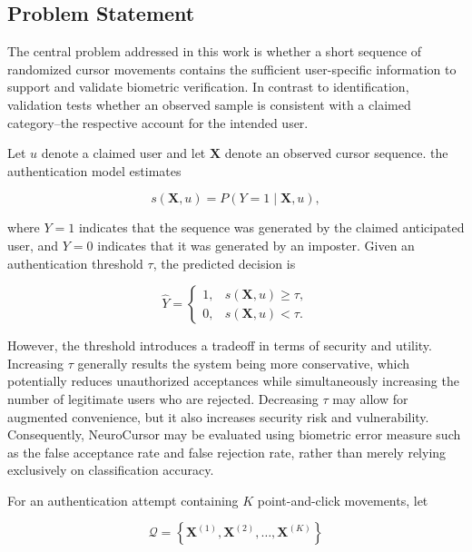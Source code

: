 \documentclass[conference]{IEEEtran}
\begin{document}
\subsection{Problem Statement}

The central problem addressed in this work is whether a short sequence of randomized cursor movements contains the sufficient user-specific information to support and validate biometric verification. In contrast to identification, validation tests whether an observed sample is consistent with a claimed category--the respective account for the intended user. 

Let $u$ denote a claimed user and let $\mathbf{X}$ denote an observed cursor sequence. the authentication model estimates 

\begin{equation}
s(\mathbf{X},u)
=
P(Y=1 \mid \mathbf{X}, u), 
\label{eq:auth_probability}
\end{equation}

where $Y=1$ indicates that the sequence was generated by the claimed anticipated user, and $Y=0$ indicates that it was generated by an imposter. Given an authentication threshold $\tau$, the predicted decision is 

\begin{equation}
\widehat{Y}
=
\begin{cases}
1, & s(\mathbf{X}, u) \geq \tau,\\
0, & s(\mathbf{X}, u) < \tau.
\end{cases}
\label{eq:threshold_decision}
\end{equation}

However, the threshold introduces a tradeoff in terms of security and utility. Increasing $\tau$ generally results the system being more conservative, which potentially reduces unauthorized acceptances while simultaneously increasing the number of legitimate users who are rejected. Decreasing $\tau$ may allow for augmented convenience, but it also increases security risk and vulnerability. Consequently, NeuroCursor may be evaluated using biometric error measure such as the false acceptance rate and false rejection rate, rather than merely relying exclusively on classification accuracy. 

For an authentication attempt containing $K$ point-and-click movements, let

\begin{equation}
\mathcal{Q}
=
\left\{
\mathbf{X}^{(1)},
\mathbf{X}^{(2)},
\ldots,
\mathbf{X}^{(K)}
\right\}
\label{eq:challenge_set}
\end{equation}
\end{document}

